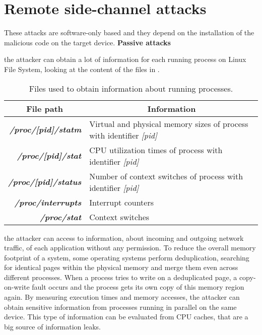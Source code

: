\section{Remote side-channel attacks}
These attacks are software-only based and they depend on the installation of the malicious code on the target device. 
\textbf{Passive attacks}
\begin{itemize}
{the attacker can obtain a lot of information for each running process on Linux File System, looking at the content of the files in .
\begin{table}[H]
\centering \footnotesize
\renewcommand*\arraystretch{1.3}
\begin{tabular}{rl}
\toprule
\multicolumn{1}{c}{\textbf{File path}} & \multicolumn{1}{c}{\textbf{Information}}\\
\midrule
{\textbf{\textit{/proc/[pid]/statm}}} & {Virtual and physical memory sizes of process with identifier \textit{[pid]}}\\
{\textbf{\textit{/proc/[pid]/stat}}} & {CPU utilization times of process with identifier \textit{[pid]}}\\
{\textbf{\textit{/proc/[pid]/status}}} & {Number of context switches of process with identifier \textit{[pid]}}\\
{\textbf{\textit{/proc/interrupts}}} & {Interrupt counters}\\
{\textbf{\textit{/proc/stat}}} & {Context switches}\\
\bottomrule
\end{tabular}
\caption{\footnotesize{Files used to obtain information about running processes.}}
\label{sc:proc}
\end{table}
}
{the attacker can access to information, about incoming and outgoing network traffic, of each application without any permission.}
{To reduce the overall memory footprint of a system, some operating systems perform deduplication, searching for identical pages within the physical memory and merge them even across different processes. When a process tries to write on a deduplicated page, a copy-on-write fault occurs and the process gets its own copy of this memory region again.}
{By measuring execution times and memory accesses, the attacker can obtain sensitive information from processes running in parallel on the same device. This type of information can be evaluated from CPU caches, that are a big source of information leaks.}

\end{itemize}
